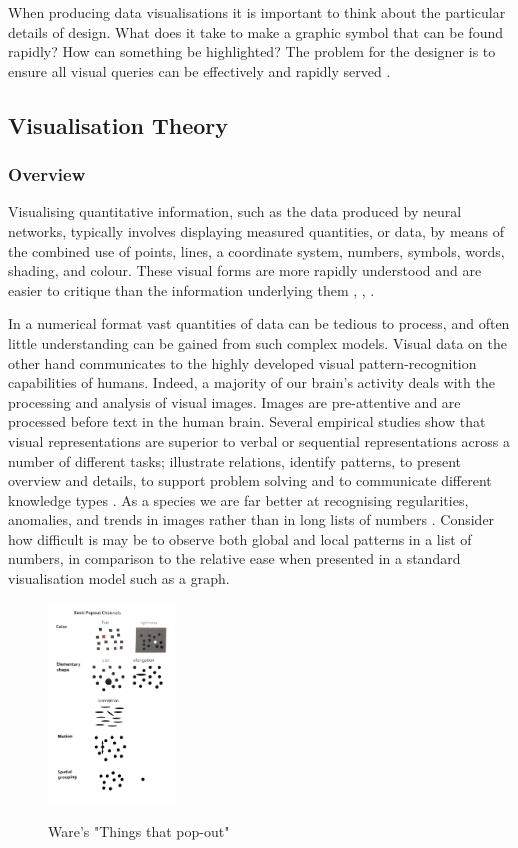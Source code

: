 \documentclass[a4paper,11pt,titlepage]{article}
\begin{document}
		\par 
		When producing data visualisations it is important to think about the particular details of design. What does it take to make a graphic symbol that can be found rapidly? How can something be highlighted? The problem for the designer is to ensure all visual queries can be effectively and rapidly served \cite{Keim2002}. 

	\subsection{Visualisation Theory}
	\subsubsection{Overview}
		Visualising quantitative information, such as the data produced by neural networks, typically involves displaying measured quantities, or data, by means of the combined use of points, lines, a coordinate system, numbers, symbols, words, shading, and colour. These visual forms are more rapidly understood and are easier to critique than the information underlying them \cite{DeFanti1989}, \cite{McCormick1987}, \cite{Tufte2001}.
		\par
		In a numerical format vast quantities of data can be tedious to process, and often little understanding can be gained from such complex models. Visual data on the other hand communicates to the highly developed visual pattern-recognition capabilities of humans. Indeed, a majority of our brain's activity deals with the processing and analysis of visual images. Images are pre-attentive and are processed before text in the human brain. Several empirical studies show that visual representations are superior to verbal or sequential representations across a number of different tasks; illustrate relations, identify patterns, to present overview and details, to support problem solving and to communicate different knowledge types \cite{Burkhard2004}. As a species we are far better at recognising regularities, anomalies, and trends in images rather than in long lists of numbers \cite{Ware2010}. Consider how difficult is may be to observe both global and local patterns in a list of numbers, in comparison to the relative ease when presented in a standard visualisation model such as a graph.
	  		 
  		\begin{figure}[H]
    			\centering	
			{{\includegraphics[width=0.3\textwidth]
    				{img/ware_popout_channels.png} 
    			}}%
    			\caption{Ware's "Things that pop-out"}%
    		\label{fig:Ware Pop-Out}
		\end{figure}
  		 		
\end{document}
